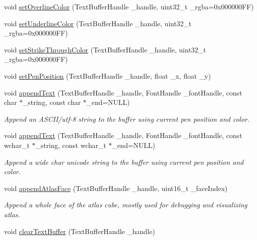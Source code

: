 \begin{DoxyCompactItemize}
\item 
void \hyperlink{class_text_buffer_manager_ad8f0df51cfa8e782f4c79b96a77355c9}{set\+Overline\+Color} (Text\+Buffer\+Handle \+\_\+handle, uint32\+\_\+t \+\_\+rgba=0x000000\+F\+F)
\item 
void \hyperlink{class_text_buffer_manager_ad172ff06de26d85eecc5114e21bd920a}{set\+Underline\+Color} (Text\+Buffer\+Handle \+\_\+handle, uint32\+\_\+t \+\_\+rgba=0x000000\+F\+F)
\item 
void \hyperlink{class_text_buffer_manager_a95647c493a0982524117501cf95febf1}{set\+Strike\+Through\+Color} (Text\+Buffer\+Handle \+\_\+handle, uint32\+\_\+t \+\_\+rgba=0x000000\+F\+F)
\item 
void \hyperlink{class_text_buffer_manager_aa043798bbd2d128fa1b38ee9075e9de7}{set\+Pen\+Position} (Text\+Buffer\+Handle \+\_\+handle, float \+\_\+x, float \+\_\+y)
\item 
void \hyperlink{class_text_buffer_manager_ab10876cf56d56a218c15c3a9f4b110fe}{append\+Text} (Text\+Buffer\+Handle \+\_\+handle, Font\+Handle \+\_\+font\+Handle, const char $\ast$\+\_\+string, const char $\ast$\+\_\+end=N\+U\+L\+L)
\begin{DoxyCompactList}\small\item\em Append an A\+S\+C\+I\+I/utf-\/8 string to the buffer using current pen position and color. \end{DoxyCompactList}\item 
void \hyperlink{class_text_buffer_manager_a5f623894fd3d041751aa7e7b272356e6}{append\+Text} (Text\+Buffer\+Handle \+\_\+handle, Font\+Handle \+\_\+font\+Handle, const wchar\+\_\+t $\ast$\+\_\+string, const wchar\+\_\+t $\ast$\+\_\+end=N\+U\+L\+L)
\begin{DoxyCompactList}\small\item\em Append a wide char unicode string to the buffer using current pen position and color. \end{DoxyCompactList}\item 
void \hyperlink{class_text_buffer_manager_a4f60ad87103f57bf1f89acc77206a20a}{append\+Atlas\+Face} (Text\+Buffer\+Handle \+\_\+handle, uint16\+\_\+t \+\_\+face\+Index)
\begin{DoxyCompactList}\small\item\em Append a whole face of the atlas cube, mostly used for debugging and visualizing atlas. \end{DoxyCompactList}\item 
void \hyperlink{class_text_buffer_manager_abf7145a574c396e6efd03d65c83a8ef7}{clear\+Text\+Buffer} (Text\+Buffer\+Handle \+\_\+handle)

\end{DoxyCompactItemize}
